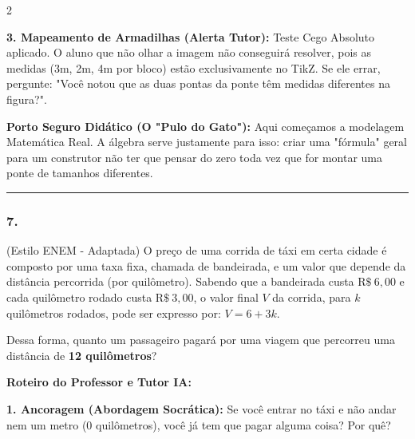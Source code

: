 \begin{multicols*}{2}
\begin{tcolorbox}[colback=CorTitUm!5, colframe=CorTitUm, boxrule=1pt, arc=4pt, left=6pt, right=6pt, top=6pt, bottom=6pt]
    \textbf{3. Mapeamento de Armadilhas (Alerta Tutor):} Teste Cego Absoluto aplicado. O aluno que não olhar a imagem não conseguirá resolver, pois as medidas (3m, 2m, 4m por bloco) estão exclusivamente no TikZ. Se ele errar, pergunte: "Você notou que as duas pontas da ponte têm medidas diferentes na figura?".
    \end{tcolorbox}
    \vspace{0.15cm}
    
    \begin{boxexplicacao}
    \textbf{Porto Seguro Didático (O "Pulo do Gato"):} Aqui começamos a modelagem Matemática Real. A álgebra serve justamente para isso: criar uma "fórmula" geral para um construtor não ter que pensar do zero toda vez que for montar uma ponte de tamanhos diferentes.
    \end{boxexplicacao}
\fi

\par\vspace{\espacoQuestao}

\noindent\textcolor{CorLinha}{\rule{\linewidth}{0.5pt}} 
\par\vspace{\espacoPreQuestao}
\subsubsection*{7.} 
\begin{enunciadoLiteral}
(Estilo ENEM - Adaptada) O preço de uma corrida de táxi em certa cidade é composto por uma taxa fixa, chamada de bandeirada, e um valor que depende da distância percorrida (por quilômetro). Sabendo que a bandeirada custa $ \text{R\$} \ 6,00 $ e cada quilômetro rodado custa $ \text{R\$} \ 3,00 $, o valor final $V$ da corrida, para $k$ quilômetros rodados, pode ser expresso por:
$ V = 6 + 3k $.

Dessa forma, quanto um passageiro pagará por uma viagem que percorreu uma distância de \textbf{12 quilômetros}?
\end{enunciadoLiteral}

\ifgabarito
    \begin{tcolorbox}[colback=CorTitUm!5, colframe=CorTitUm, boxrule=1pt, arc=4pt, left=6pt, right=6pt, top=6pt, bottom=6pt]
    \small\textbf{\textcolor{CorTitUm}{Roteiro do Professor e Tutor IA:}}\par\vspace{0.1cm}
    \color{CinzaEscuro}
    \textbf{1. Ancoragem (Abordagem Socrática):} Se você entrar no táxi e não andar nem um metro (0 quilômetros), você já tem que pagar alguma coisa? Por quê?\par\vspace{0.1cm}
    

\end{tcolorbox}
\end{multicols*}
